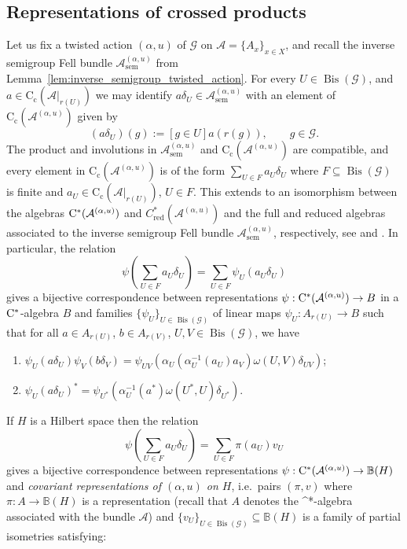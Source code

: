\documentclass[11 pt, leqno]{amsart}
\numberwithin{equation}{section}
\theoremstyle{plain}
\theoremstyle{definition}
\newcommand*{\contc}{\mathrm{C_c}}%
\DeclareMathOperator{\red}{red}%
\DeclareMathOperator{\sem}{sem}
\DeclareMathOperator{\Bis}{Bis}
\newcommand{\BB}{\mathbb B}
\newcommand{\G}{\mathcal G} %
\newcommand{\A}{\mathcal A}
\newcommand{\cst}{\ifmmode\mathrm{C}^*\else{$\mathrm{C}^*$}\fi}
\begin{document}
%
\subsection{Representations of crossed products} 
\label{sec:representations_of_crossed_products}

Let us fix a twisted action $(\alpha, u)$ of $\G$  on $\A = \{ A_x \}_{x\in X}$, and recall the inverse semigroup Fell bundle $\A_{\sem}^{(\alpha,u)}$ from Lemma~\ref{lem:inverse_semigroup_twisted_action}.
For every  $U\in \Bis(\G)$, and $a\in \contc(\A|_{r(U)})$ we may identify $a\delta_U\in \A_{\sem}^{(\alpha,u)}$ with an element of $\contc(\A^{(\alpha,u)})$ given by 
\[
    (a\delta_U)(g) := [g\in U] a(r(g)),\qquad  g\in \G.
\] 
The product and involutions in $\A_{\sem}^{(\alpha,u)}$ and $\contc(\A^{(\alpha,u)})$ are compatible, and every element in $\contc(\A^{(\alpha,u)})$ is of the form $\sum_{U\in F}a_U\delta_U$ where $F\subseteq \Bis(\G)$ is finite and $a_U\in \contc(\A|_{r(U)})$, $U\in F$. 
This extends to an isomorphism between the algebras $\cst(\A^{(\alpha,u)})$ and  $C_{\red}^*(\A^{(\alpha,u)})$ and the full and reduced algebras associated to the inverse semigroup Fell bundle $\A_{\sem}^{(\alpha,u)}$, respectively, see \cite[Theorem~5.5]{BussMeyer} and \cite[Theorem~2.15, Theorem~4.11]{BussExel}. 
In particular, the relation 
\[
    \psi(\sum_{U\in F}a_U\delta_U)=\sum_{U\in F} \psi_{U}(a_U\delta_U)
\]
gives a bijective correspondence between representations $\psi : \cst(\A^{(\alpha,u)}) \to B$ in a $\cst$-algebra $B$ and families $\{ \psi_{U} \}_{ U\in\Bis(\G) }$ of linear maps $\psi_{U} : A_{r(U)} \to B$ such that for all $a\in A_{r(U)}$, $b \in A_{r(V)}$, $U,V\in \Bis(\G)$, we have
\begin{enumerate}[labelindent=40pt,label={(SR\arabic*)},itemindent=1em] 
    \item\label{item:semigroup_representation1'} $\psi_U(a\delta_U) \psi_V(b\delta_{V}) = \psi_{UV}( \alpha_U(\alpha_{U}^{-1}(a_U)a_V ) \omega(U,V) \delta_{UV})$;
    \item \label{item:semigroup_representation2'} $\psi_U(a\delta_U)^* = \psi_{U^*}(\alpha_U^{-1}(a^*) \omega(U^*,U) \delta_{U^*})$. 
\end{enumerate}
If $H$ is a Hilbert space then the relation 
\[
    \psi(\sum_{U\in F}a_U\delta_U)=\sum_{U\in F} \pi(a_U) v_{U}
\] 
gives a bijective correspondence between representations $\psi:\cst(\A^{(\alpha,u)})\to \BB(H)$ and \emph{covariant representations of $(\alpha, u)$ on $H$}, i.e.\ pairs $(\pi,v)$ where $\pi: A \to \BB(H)$ is a representation (recall that $A$ denotes the \cst-algebra associated with the bundle $\A$) and $\{v_U\}_{U\in \Bis(\G)}\subseteq \BB(H)$ is a family of partial isometries satisfying: 
\end{document}
